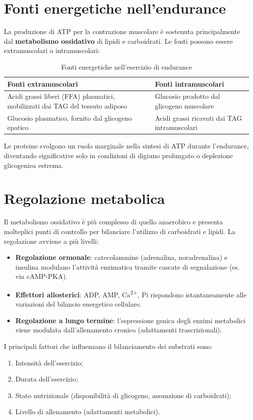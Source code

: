 \documentclass[12pt,a4paper]{report}
\begin{document}
\section{Fonti energetiche nell'endurance}
La produzione di ATP per la contrazione muscolare è sostenuta principalmente dal \textbf{metabolismo ossidativo} di lipidi e carboidrati. Le fonti possono essere extramuscolari o intramuscolari:
\begin{table}[htbp]
\centering
\caption{Fonti energetiche nell'esercizio di endurance}
\label{tab:fonti-endurance}
\renewcommand{\arraystretch}{1.2}
\begin{tabular}{@{} p{} p{} @{}}
\toprule
\textbf{Fonti extramuscolari} & \textbf{Fonti intramuscolari} \\
\midrule
\textbullet{} Acidi grassi liberi (FFA) plasmatici, mobilizzati dai TAG del tessuto adiposo & \textbullet{} Glucosio prodotto dal glicogeno muscolare \\
\textbullet{} Glucosio plasmatico, fornito dal glicogeno epatico & \textbullet{} Acidi grassi ricavati dai TAG intramuscolari \\
\bottomrule
\end{tabular}
\end{table}
Le proteine svolgono un ruolo marginale nella sintesi di ATP durante l'endurance, diventando significative solo in condizioni di digiuno prolungato o deplezione glicogenica estrema.

\section{Regolazione metabolica}
Il metabolismo ossidativo è più complesso di quello anaerobico e presenta molteplici punti di controllo per bilanciare l'utilizzo di carboidrati e lipidi. La regolazione avviene a più livelli:
\begin{itemize}
\item \textbf{Regolazione ormonale}: catecolammine (adrenalina, noradrenalina) e insulina modulano l'attività enzimatica tramite cascate di segnalazione (es. via cAMP-PKA).
\item \textbf{Effettori allosterici}: ADP, AMP, Ca\textsuperscript{2+}, Pi rispondono istantaneamente alle variazioni del bilancio energetico cellulare.
\item \textbf{Regolazione a lungo termine}: l'espressione genica degli enzimi metabolici viene modulata dall'allenamento cronico (adattamenti trascrizionali).
\end{itemize}
I principali fattori che influenzano il bilanciamento dei substrati sono:
\begin{enumerate}
\item Intensità dell'esercizio;
\item Durata dell'esercizio;
\item Stato nutrizionale (disponibilità di glicogeno, assunzione di carboidrati);
\item Livello di allenamento (adattamenti metabolici).
\end{enumerate}
\end{document}
